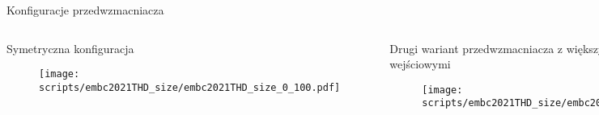\begin{frame}{Konfiguracje przedwzmacniacza}


    \begin{columns}

        \begin{block}{Symetryczna konfiguracja}


            \begin{figure}[H]
                \centering
                \texttt{[image: scripts/embc2021THD\_size/embc2021THD\_size\_0\_100.pdf]}
            \end{figure}   
        \end{block}


        \begin{block}{Drugi wariant przedwzmacniacza z większymi pojemnościami wejściowymi}


            \begin{figure}[H]
                \centering
                \texttt{[image: scripts/embc2021THD\_size/embc2021THD\_size\_1\_100.pdf]}
            \end{figure}   
        \end{block}
    \end{columns}


\end{frame}

